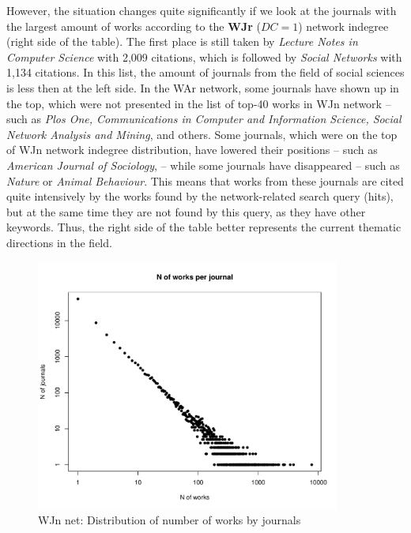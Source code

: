 \documentclass[11pt]{article} %
\begin{document}
However, the situation changes quite significantly if we look at the journals with the largest amount of works according to the \textbf{WJr} ($DC=1$) network indegree (right side of the table). The first place is still taken by \textit{Lecture Notes in Computer Science} with 2,009 citations, which is followed by \textit{Social Networks} with 1,134 citations. In this list, the amount of journals from the field of social sciences is less then at the left side. In the WAr network, some journals have shown up in the top, which were not presented in the list of top-40 works in WJn network -- such as \textit{Plos One, Communications in Computer and Information Science, Social Network Analysis and Mining}, and others. Some journals, which were on the top of WJn network indegree distribution, have lowered their positions -- such as \textit{American Journal of Sociology}, -- while some journals have disappeared -- such as \textit{Nature} or \textit{Animal Behaviour}. This means that works from these journals are cited quite intensively by the works found by the network-related search query (hits), but at the same time they are not found by this query, as they have other keywords. Thus, the right side of the table better represents the current thematic directions in the field. 

\begin{figure}
\centerline{\includegraphics[width=100mm]{Rplot_WJs_new_indeg.pdf}}
\caption{WJn net: Distribution of number of works by journals}\label{worksjour}
\end{figure}
\medskip   
\end{document}
